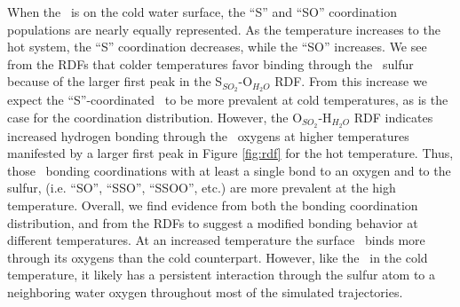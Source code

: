 When the \suldiox~is on the cold water surface, the ``S'' and ``SO'' coordination populations are nearly equally represented. As the temperature increases to the hot system, the ``S'' coordination decreases, while the ``SO'' increases. We see from the RDFs that colder temperatures favor binding through the \suldiox~sulfur because of the larger first peak in the S$_{SO_2}$-O$_{H_2O}$ RDF. From this increase we expect the ``S''-coordinated \suldiox~to be more prevalent at cold temperatures, as is the case for the coordination distribution. However, the O$_{SO_2}$-H$_{H_2O}$ RDF indicates increased hydrogen bonding through the \suldiox~oxygens at higher temperatures manifested by a larger first peak in Figure \ref{fig:rdf} for the hot temperature. Thus, those \suldiox~bonding coordinations with at least a single bond to an oxygen and to the sulfur, (i.e. ``SO'', ``SSO'', ``SSOO'', etc.) are more prevalent at the high temperature. Overall, we find evidence from both the bonding coordination distribution, and from the RDFs to suggest a modified bonding behavior at different temperatures. At an increased temperature the surface \suldiox~binds more through its oxygens than the cold counterpart. However, like the \suldiox~in the cold temperature, it likely has a persistent interaction through the sulfur atom to a neighboring water oxygen throughout most of the simulated trajectories.
